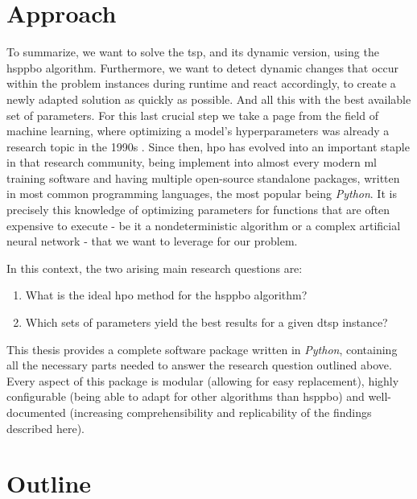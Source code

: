 \section{Approach}

To summarize, we want to solve the \gls{tsp}, and its dynamic version, using the \gls{hsppbo} algorithm. Furthermore, we want to detect dynamic changes that occur within the problem instances during runtime and react accordingly, to create a newly adapted solution as quickly as possible. And all this with the best available set of parameters. For this last crucial step we take a page from the field of machine learning, where optimizing a model's hyperparameters was already a research topic in the 1990s \cite{feurer2019hyperparameter}. Since then, \gls{hpo} has evolved into an important staple in that research community, being implement into almost every modern \gls{ml} training software and having multiple open-source standalone packages, written in most common programming languages, the most popular being \textit{Python}.
It is precisely this knowledge of optimizing parameters for functions that are often expensive to execute - be it a nondeterministic algorithm or a complex artificial neural network - that we want to leverage for our problem.

In this context, the two arising main research questions are:
\begin{enumerate}
	\item What is the ideal \gls{hpo} method for the \gls{hsppbo} algorithm?
	\item Which sets of parameters yield the best results for a given \gls{dtsp} instance?
\end{enumerate}

This thesis provides a complete software package written in \textit{Python}, containing all the necessary parts needed to answer the research question outlined above. Every aspect of this package is modular (allowing for easy replacement), highly configurable (being able to adapt for other algorithms than \gls{hsppbo}) and well-documented (increasing comprehensibility and replicability of the findings described here).


\section{Outline}

